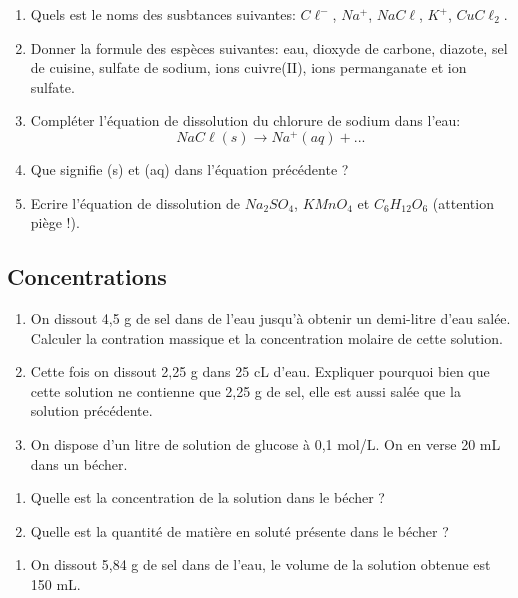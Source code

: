 \documentclass[
]{book}
\providecommand{\tightlist}{%
  \setlength{\itemsep}{0pt}\setlength{\parskip}{0pt}}
\def\tightlist{}
\begin{document}
\begin{enumerate}
\def\labelenumi{\arabic{enumi}.}
\tightlist
\item
  Quels est le noms des susbtances suivantes: \(C\ell^-\), \(Na^+\), \(NaC\ell\), \(K^+\), \(CuC\ell_2\).
\item
  Donner la formule des espèces suivantes: eau, dioxyde de carbone, diazote, sel de cuisine, sulfate de sodium, ions cuivre(II), ions permanganate et ion sulfate.
\item
  Compléter l'équation de dissolution du chlorure de sodium dans l'eau: \[NaC\ell(s)\longrightarrow Na^+(aq) + ...\]
\item
  Que signifie (s) et (aq) dans l'équation précédente ?
\item
  Ecrire l'équation de dissolution de \(Na_2SO_4\), \(KMnO_4\) et \(C_6H_{12}O_6\) (attention piège !).
\end{enumerate}

\hypertarget{concentrations}{%
\subsection{Concentrations}\label{concentrations}}

\begin{enumerate}
\def\labelenumi{\arabic{enumi}.}
\tightlist
\item
  On dissout 4,5 g de sel dans de l'eau jusqu'à obtenir un demi-litre d'eau salée. Calculer la contration massique et la concentration molaire de cette solution.
\item
  Cette fois on dissout 2,25 g dans 25 cL d'eau. Expliquer pourquoi bien que cette solution ne contienne que 2,25 g de sel, elle est aussi salée que la solution précédente.
\item
  On dispose d'un litre de solution de glucose à 0,1 mol/L. On en verse 20 mL dans un bécher.
\end{enumerate}

\begin{enumerate}
\def\labelenumi{\alph{enumi}.}
\tightlist
\item
  Quelle est la concentration de la solution dans le bécher ?
\item
  Quelle est la quantité de matière en soluté présente dans le bécher ?
\end{enumerate}

\begin{enumerate}
\def\labelenumi{\arabic{enumi}.}
\setcounter{enumi}{3}
\tightlist
\item
  On dissout 5,84 g de sel dans de l'eau, le volume de la solution obtenue est 150 mL.
\end{enumerate}
\end{document}
